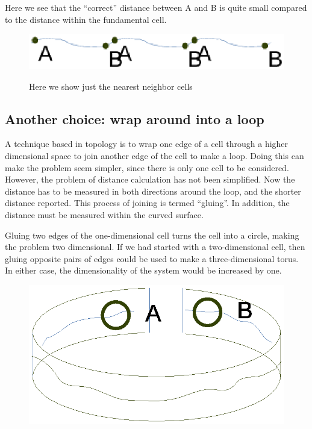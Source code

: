 \documentclass[preprint]{iucr}              %
\numberwithin{equation}{section}
\begin{document}
	Here we see that the ``correct'' distance between A and B is
	quite small compared to the distance within the 
	fundamental cell.
\begin{figure}
	\includegraphics[width=\textwidth]{line_3}
	\label{line_3}
	\caption{Here we show just the nearest neighbor cells}
\end{figure}

\subsection{Another choice: wrap around into a loop}
	A technique based in topology is to wrap one edge of a
	cell through a higher dimensional space to join
	another edge of the cell to make a loop. Doing this can make the 
	problem seem simpler, since there is only one cell
	to be considered. However, the problem of distance calculation has
	not been simplified. Now the distance has to be measured
	in both directions around the loop, and the shorter distance
	reported. This process of joining is termed ``gluing''. In
	addition, the distance must be measured within the curved
	surface.
	
     Gluing two edges of the one-dimensional cell
	turns the cell into a circle, making the problem
	two dimensional. 	If 
	we had started with a two-dimensional cell,
	then gluing opposite pairs of edges could be used to
	make a three-dimensional torus. In either case, the dimensionality of the system
	would be increased by one. 
\begin{figure}
	\includegraphics[width=\textwidth]{loop}		
	\label{loop}
	\caption{}
\end{figure}
\end{document}
